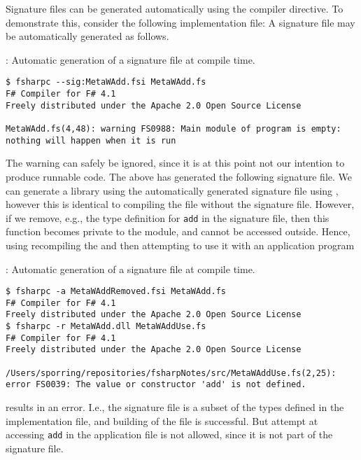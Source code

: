 Signature files can be generated automatically using the  compiler directive. To demonstrate this, consider the following implementation file:
%
%
A signature file may be automatically generated as follows.
\begin{codeNOutput}{: Automatic generation of a signature file at compile time.}
\begin{lstlisting}[language=console,escapechar=§]
$ fsharpc --sig:MetaWAdd.fsi MetaWAdd.fs
F# Compiler for F# 4.1
Freely distributed under the Apache 2.0 Open Source License

MetaWAdd.fs(4,48): warning FS0988: Main module of program is empty: nothing will happen when it is run
\end{lstlisting}%
\end{codeNOutput}
The warning can safely be ignored, since it is at this point not our intention to produce runnable code. The above has generated the following signature file.
%
%
We can generate a library using the automatically generated signature file using , however this is identical to compiling the  file without the signature file. However, if we remove, e.g., the type definition for \lstinline{add} in the signature file, then this function becomes private to the module, and cannot be accessed outside. Hence, using 
%
%
recompiling the  and then attempting to use it with an application program
\begin{codeNOutput}{: Automatic generation of a signature file at compile time.}
\begin{lstlisting}[language=console,escapechar=§]
$ fsharpc -a MetaWAddRemoved.fsi MetaWAdd.fs
F# Compiler for F# 4.1
Freely distributed under the Apache 2.0 Open Source License
$ fsharpc -r MetaWAdd.dll MetaWAddUse.fs 
F# Compiler for F# 4.1
Freely distributed under the Apache 2.0 Open Source License

/Users/sporring/repositories/fsharpNotes/src/MetaWAddUse.fs(2,25): error FS0039: The value or constructor 'add' is not defined.
\end{lstlisting}
\end{codeNOutput}
results in an error. I.e., the signature file is a subset of the types defined in the implementation file, and building of the  file is successful. But attempt at accessing \lstinline{add} in the application file is not allowed, since it is not part of the signature file.

